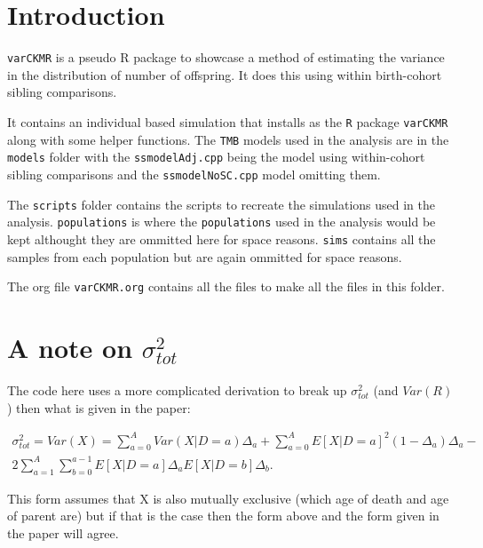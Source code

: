 \documentclass[11pt]{article}
\author{Jonathan Babyn}
\date{\today}
\title{}
\begin{document}
\section{Introduction}
\label{sec:org4b7a35b}

  \texttt{varCKMR} is a pseudo R package to showcase a method of estimating the variance in
the distribution of number of offspring. It does this using within birth-cohort 
sibling comparisons. 

It contains an individual based simulation that installs as the \texttt{R} package \texttt{varCKMR} along with 
some helper functions.
The \texttt{TMB} models used in the analysis are in the \texttt{models} folder with the \texttt{ssmodelAdj.cpp}
being the model using within-cohort sibling comparisons and the \texttt{ssmodelNoSC.cpp} model 
omitting them.

The \texttt{scripts} folder contains the scripts to recreate the simulations used in the analysis. \texttt{populations}
is where the \texttt{populations} used in the analysis would be kept althought they are ommitted here for space reasons. 
\texttt{sims} contains all the samples from each population but are again ommitted for space reasons. 

The org file \texttt{varCKMR.org} contains all the files to make all the files in this folder.

\section{A note on \(\sigma^2_{tot}\)}
\label{sec:org8beaf97}

The code here uses a more complicated derivation  to break up \(\sigma^2_{tot}\) (and \(Var(R)\)) then what is given in the
paper:

\begin{multline}
\label{muteqlaw2}
\sigma^2_{tot} = Var(X) = \sum_{a=0}^A Var(X|D = a)\Delta_a + \sum_{a=0}^A E[X| D = a]^2(1-\Delta_a)\Delta_a- \\ 
 2\sum_{a=1}^A\sum_{b=0}^{a-1} E[X|D = a] \Delta_a E[X|D = b] \Delta_b.
\end{multline}

This form assumes that X is also mutually exclusive (which age of death and age of parent are) but if that is the case then the form above and the form
given in the paper will agree.
\end{document}
